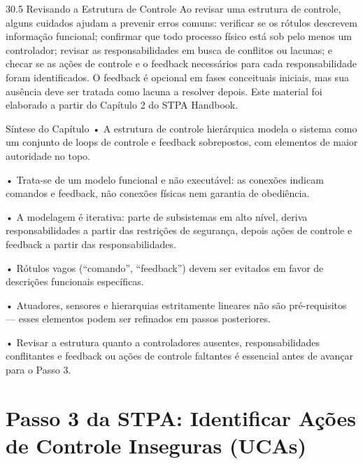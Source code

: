 30.5 Revisando a Estrutura de Controle Ao revisar uma estrutura de controle, alguns cuidados ajudam a prevenir erros comuns: verificar se os rótulos descrevem informação funcional; confirmar que todo processo físico está sob pelo menos um controlador; revisar as responsabilidades em busca de conflitos ou lacunas; e checar se as ações de controle e o feedback necessários para cada responsabilidade foram identificados. O feedback é opcional em fases conceituais iniciais, mas sua ausência deve ser tratada como lacuna a resolver depois. Este material foi elaborado a partir do Capítulo 2 do STPA Handbook.

Síntese do Capítulo • A estrutura de controle hierárquica modela o sistema como um conjunto de loops de controle e feedback sobrepostos, com elementos de maior autoridade no topo.

• Trata-se de um modelo funcional e não executável: as conexões indicam comandos e feedback, não conexões físicas nem garantia de obediência.

• A modelagem é iterativa: parte de subsistemas em alto nível, deriva responsabilidades a partir das restrições de segurança, depois ações de controle e feedback a partir das responsabilidades.

• Rótulos vagos (“comando”, “feedback”) devem ser evitados em favor de descrições funcionais específicas.

• Atuadores, sensores e hierarquias estritamente lineares não são pré-requisitos — esses elementos podem ser refinados em passos posteriores.

• Revisar a estrutura quanto a controladores ausentes, responsabilidades conflitantes e feedback ou ações de controle faltantes é essencial antes de avançar para o Passo 3.

\chapter{Passo 3 da STPA: Identificar Ações de Controle Inseguras (UCAs)}


